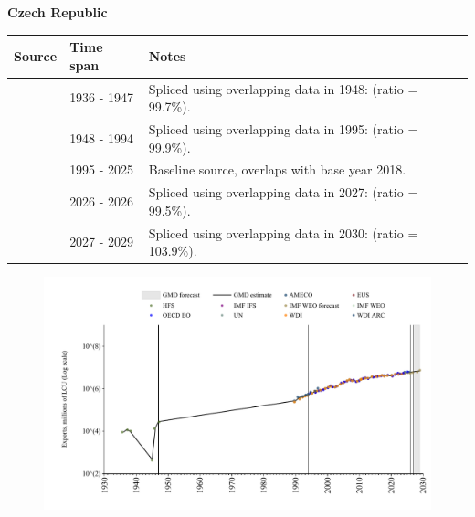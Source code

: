 \documentclass[12pt,a4paper,landscape]{article}
\begin{document}
\begin{adjustbox}{max totalsize={\paperwidth}{\paperheight},center}
\begin{minipage}[t][\textheight][t]{\textwidth}
\vspace*{0.5cm}
{}
\begin{center}
{\Large\bfseries Czech Republic}
\end{center}
\vspace{0.5cm}
\begin{table}[H]
\centering
\small
\begin{tabular}{|l|l|l|}
\hline
\textbf{Source} & \textbf{Time span} & \textbf{Notes} \\
\hline
\rowcolor{white}\cite{HFS}& 1936 - 1947 &Spliced using overlapping data in 1948: (ratio = 99.7\%).\\
\rowcolor{lightgray}\cite{AMECO}& 1948 - 1994 &Spliced using overlapping data in 1995: (ratio = 99.9\%).\\
\rowcolor{white}\cite{OECD_EO}& 1995 - 2025 &Baseline source, overlaps with base year 2018.\\
\rowcolor{lightgray}\cite{AMECO}& 2026 - 2026 &Spliced using overlapping data in 2027: (ratio = 99.5\%).\\
\rowcolor{white}\cite{IMF_WEO_forecast}& 2027 - 2029 &Spliced using overlapping data in 2030: (ratio = 103.9\%).\\
\hline
\end{tabular}
\end{table}
\begin{figure}[H]
\centering
\includegraphics[width=\textwidth,height=0.6\textheight,keepaspectratio]{graphs/CZE_exports.pdf}
\end{figure}
\end{minipage}
\end{adjustbox}
\end{document}
